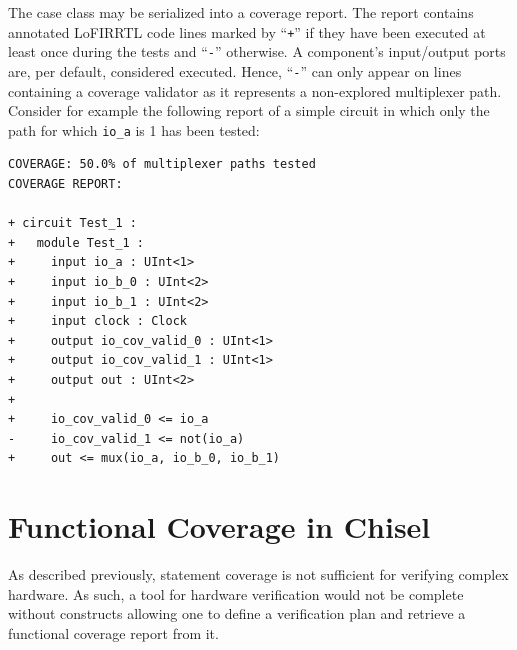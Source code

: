 \documentclass[conference]{IEEEtran}
\newcommand{\martin}[1]{{\color{blue} Martin: #1}}
\begin{document}
The case class may be serialized into a coverage report. The report contains annotated LoFIRRTL code lines marked by ``\texttt{+}'' if they have been executed at least once during the tests and ``\texttt{-}'' otherwise. A component's input/output ports are, per default, considered executed. Hence, ``\texttt{-}'' can only appear on lines containing a coverage validator as it represents a non-explored multiplexer path. Consider for example the following report of a simple circuit in which only the path for which \texttt{io\_a} is 1 has been tested:
\begin{verbatim}
COVERAGE: 50.0% of multiplexer paths tested
COVERAGE REPORT:

+ circuit Test_1 :
+   module Test_1 :
+     input io_a : UInt<1>
+     input io_b_0 : UInt<2>
+     input io_b_1 : UInt<2>
+     input clock : Clock
+     output io_cov_valid_0 : UInt<1>
+     output io_cov_valid_1 : UInt<1>
+     output out : UInt<2>
+   
+     io_cov_valid_0 <= io_a
-     io_cov_valid_1 <= not(io_a)
+     out <= mux(io_a, io_b_0, io_b_1)
\end{verbatim}



\section{Functional Coverage in Chisel}
As described previously, statement coverage is not sufficient for verifying complex hardware. As such, a tool for hardware verification would not be complete without constructs allowing one to define a verification plan and retrieve a functional coverage report from it. %
\end{document}
